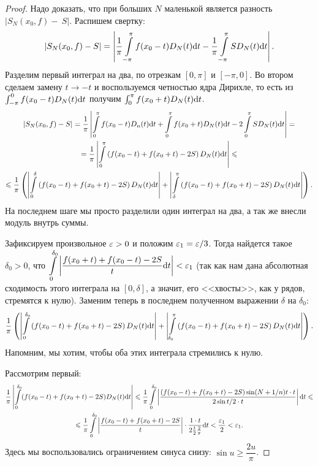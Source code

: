 \begin{proof}
Надо доказать, что при больших $N$ маленькой является разность $|S_N(x_0, f) -~S|$. Распишем свертку:
\begin{gather*}
|S_N(x_0, f) - S| = \left| \dfrac{1}{\pi} \int\limits_{-\pi}^{\pi}f(x_0 - t)D_N(t)\mathrm{d} t - \dfrac{1}{\pi} \int\limits_{-\pi}^{\pi}SD_N(t)\mathrm{d} t \right|.
\end{gather*}
Разделим первый интеграл на два, по отрезкам $[0, \pi]$ и $[-\pi, 0]$. Во втором сделаем замену $t \to -t$ и воспользуемся четностью ядра Дирихле, то есть из $\int_{-\pi}^{0}f(x_0 - t)D_N(t)\mathrm{d} t$ получим $\int_0^\pi f(x_0 + t)D_N(t)\mathrm{d} t$.
\begin{gather*}
|S_N(x_0, f) - S| = \dfrac{1}{\pi} \left| \int\limits_0^\pi f(x_0 - t)D_n(t)\mathrm{d} t + \int\limits_0^{\pi} f(x_0 + t)D_N(t)\mathrm{d} t - 2\int\limits_0^\pi SD_N(t) \mathrm{d} t \right| = \\ = \dfrac{1}{\pi} \left| \int\limits_0^\pi \left( f(x_0 - t) + f(x_0 + t) - 2S  \right) D_N(t) \mathrm{d} t \right| \leqslant  \\
\leqslant \dfrac{1}{\pi} \left( \left| \int\limits_0^\delta \left( f(x_0 - t) + f(x_0 + t) - 2S  \right) D_N(t) \mathrm{d} t \right| + \left| \int\limits_\delta^\pi \left( f(x_0 - t) + f(x_0 + t) - 2S  \right) D_N(t) \mathrm{d} t \right| \right).
\end{gather*}
На последнем шаге мы просто разделили один интеграл на два, а так же внесли модуль внутрь суммы.

Зафиксируем произвольное $\varepsilon > 0$ и положим $\varepsilon_1 = \varepsilon / 3$. Тогда найдется такое $\delta_0 > 0$, что $\displaystyle \int\limits_0^{\delta_0} \left| \dfrac{f(x_0 + t) + f(x_0 - t) - 2S}{t}\mathrm{d} t \right| < \varepsilon_1$ (так как нам дана абсолютная сходимость этого интеграла на $[0, \delta]$, а значит, его <<хвосты>>, как у рядов, стремятся к нулю). Заменим теперь в последнем полученном выражении $\delta$ на $\delta_0$:
$$
\dfrac{1}{\pi} \left( \left| \int\limits_0^{\delta_0} \left( f(x_0 - t) + f(x_0 + t) - 2S  \right) D_N(t) \mathrm{d} t \right| + \left| \int\limits_{\delta_0}^\pi \left( f(x_0 - t) + f(x_0 + t) - 2S  \right) D_N(t) \mathrm{d} t \right| \right).
$$
Напомним, мы хотим, чтобы оба этих интеграла стремились к нулю.

Рассмотрим первый:
\begin{gather*}
\dfrac{1}{\pi} \left| \int\limits_0^{\delta_0} ( f(x_0 - t) + f(x_0 + t) - 2S  ) D_N(t) \mathrm{d} t \right| \leqslant \dfrac{1}{\pi}  \int\limits_0^{\delta_0} \left| \dfrac{(f(x_0 - t) + f(x_0 + t) - 2S) \sin (N + 1/n)t \cdot t}{2 \sin t/2 \cdot t} \right|\mathrm{d} t \leqslant \\
\leqslant \dfrac{1}{\pi}  \int\limits_0^{\delta_0} \left| \dfrac{f(x_0 - t) + f(x_0 + t) - 2S}{t} \right|  \cdot \dfrac{1 \cdot t}{2 \frac{t}{2} \frac{2}{\pi}} \mathrm{d} t < \dfrac{\varepsilon_1}{2} < \varepsilon_1.
\end{gather*}
Здесь мы воспользовались ограничением синуса снизу: $\sin u \geq \dfrac{2u}{\pi}$.


\end{proof}
